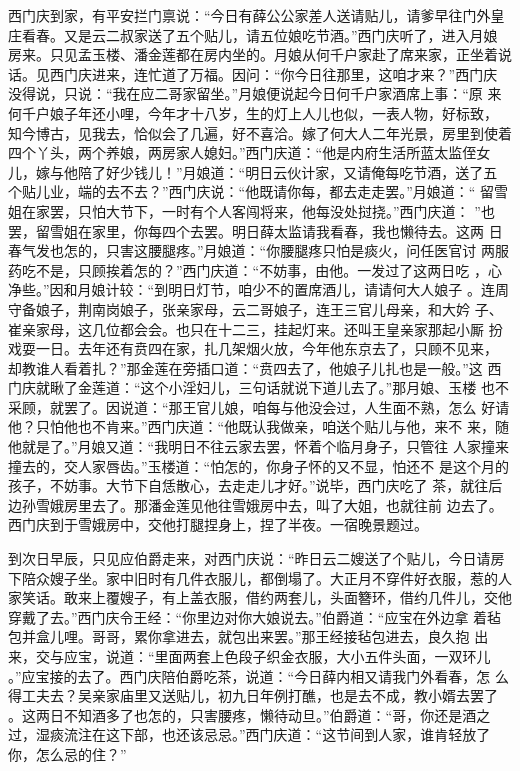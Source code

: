 西门庆到家，有平安拦门禀说：“今日有薛公公家差人送请贴儿，请爹早往门外皇
庄看春。又是云二叔家送了五个贴儿，请五位娘吃节酒。”西门庆听了，进入月娘
房来。只见孟玉楼、潘金莲都在房内坐的。月娘从何千户家赴了席来家，正坐着说
话。见西门庆进来，连忙道了万福。因问：“你今日往那里，这咱才来？”西门庆
没得说，只说：“我在应二哥家留坐。”月娘便说起今日何千户家酒席上事：“原
来何千户娘子年还小哩，今年才十八岁，生的灯上人儿也似，一表人物，好标致，
知今博古，见我去，恰似会了几遍，好不喜洽。嫁了何大人二年光景，房里到使着
四个丫头，两个养娘，两房家人媳妇。”西门庆道：“他是内府生活所蓝太监侄女
儿，嫁与他陪了好少钱儿！”月娘道：“明日云伙计家，又请俺每吃节酒，送了五
个贴儿业，端的去不去？”西门庆说：“他既请你每，都去走走罢。”月娘道：“
留雪姐在家罢，只怕大节下，一时有个人客闯将来，他每没处挝挠。”西门庆道：
”也罢，留雪姐在家里，你每四个去罢。明日薛太监请我看春，我也懒待去。这两
日春气发也怎的，只害这腰腿疼。”月娘道：“你腰腿疼只怕是痰火，问任医官讨
两服药吃不是，只顾挨着怎的？”西门庆道：“不妨事，由他。一发过了这两日吃
，心净些。”因和月娘计较：“到明日灯节，咱少不的置席酒儿，请请何大人娘子
。连周守备娘子，荆南岗娘子，张亲家母，云二哥娘子，连王三官儿母亲，和大妗
子、崔亲家母，这几位都会会。也只在十二三，挂起灯来。还叫王皇亲家那起小厮
扮戏耍一日。去年还有贲四在家，扎几架烟火放，今年他东京去了，只顾不见来，
却教谁人看着扎？”那金莲在旁插口道：“贲四去了，他娘子儿扎也是一般。”这
西门庆就瞅了金莲道：“这个小淫妇儿，三句话就说下道儿去了。”那月娘、玉楼
也不采顾，就罢了。因说道：“那王官儿娘，咱每与他没会过，人生面不熟，怎么
好请他？只怕他也不肯来。”西门庆道：“他既认我做亲，咱送个贴儿与他，来不
来，随他就是了。”月娘又道：“我明日不往云家去罢，怀着个临月身子，只管往
人家撞来撞去的，交人家唇齿。”玉楼道：“怕怎的，你身子怀的又不显，怕还不
是这个月的孩子，不妨事。大节下自恁散心，去走走儿才好。”说毕，西门庆吃了
茶，就往后边孙雪娥房里去了。那潘金莲见他往雪娥房中去，叫了大姐，也就往前
边去了。西门庆到于雪娥房中，交他打腿捏身上，捏了半夜。一宿晚景题过。

到次日早辰，只见应伯爵走来，对西门庆说：“昨日云二嫂送了个贴儿，今日请房
下陪众嫂子坐。家中旧时有几件衣服儿，都倒塌了。大正月不穿件好衣服，惹的人
家笑话。敢来上覆嫂子，有上盖衣服，借约两套儿，头面簪环，借约几件儿，交他
穿戴了去。”西门庆令王经：“你里边对你大娘说去。”伯爵道：“应宝在外边拿
着毡包并盒儿哩。哥哥，累你拿进去，就包出来罢。”那王经接毡包进去，良久抱
出来，交与应宝，说道：“里面两套上色段子织金衣服，大小五件头面，一双环儿
。”应宝接的去了。西门庆陪伯爵吃茶，说道：“今日薛内相又请我门外看春，怎
么得工夫去？吴亲家庙里又送贴儿，初九日年例打醮，也是去不成，教小婿去罢了
。这两日不知酒多了也怎的，只害腰疼，懒待动旦。”伯爵道：“哥，你还是酒之
过，湿痰流注在这下部，也还该忌忌。”西门庆道：“这节间到人家，谁肯轻放了
你，怎么忌的住？”

